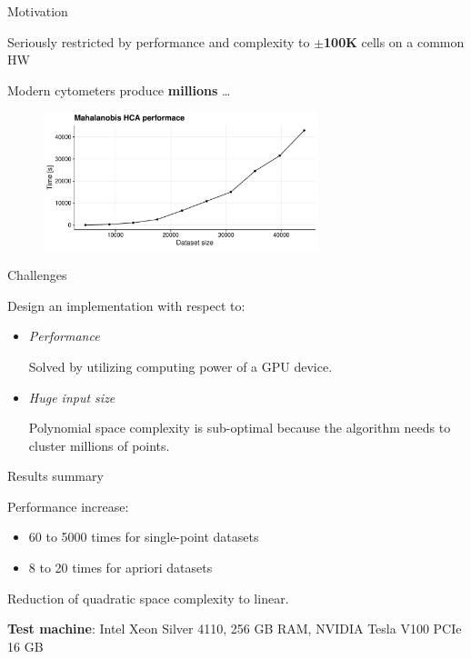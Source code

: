 \documentclass[10pt]{beamer}
\begin{document}
\begin{frame}{Motivation}

	Seriously restricted by performance and complexity to \textbf{$\pm$100K} cells on a common HW
	
	Modern cytometers produce \textbf{millions} \dots
	
	\begin{figure}
	\includegraphics[width=8cm]{img/scalability}
	\end{figure}

\end{frame}

\begin{frame}{Challenges}
	
	Design an implementation with respect to:
	\begin{itemize}
		\item \emph{Performance}
		
		Solved by utilizing computing power of a GPU device.
		\item \emph{Huge input size}
		
		Polynomial space complexity is sub-optimal because the algorithm needs to cluster millions of points.
	\end{itemize}
	
\end{frame}

\begin{frame}{Results summary}
	
	Performance increase:
	\begin{itemize}
		\item 60 to 5000 times for single-point datasets
		\item 8 to 20 times for apriori datasets
	\end{itemize}

	Reduction of quadratic space complexity to linear.
	
	\textbf{Test machine}: Intel Xeon Silver 4110, 256 GB
	RAM, NVIDIA Tesla V100 PCIe 16 GB
	
\end{frame}
\end{document}
